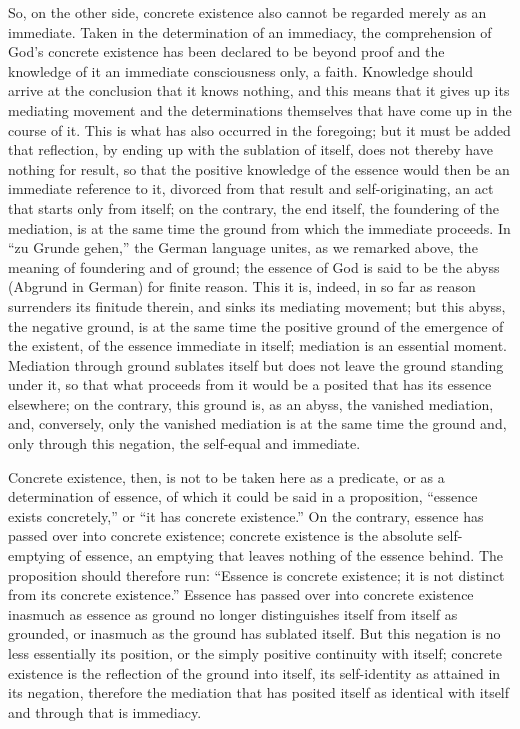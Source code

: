 So, on the other side, concrete existence also
cannot be regarded merely as an immediate.
Taken in the determination of an immediacy,
the comprehension of God's concrete existence
has been declared to be beyond proof
and the knowledge of it
an immediate consciousness only, a faith.
Knowledge should arrive at
the conclusion that it knows nothing,
and this means that it gives up its mediating movement
and the determinations themselves
that have come up in the course of it.
This is what has also occurred in the foregoing;
but it must be added that reflection,
by ending up with the sublation of itself,
does not thereby have nothing for result,
so that the positive knowledge of the essence
would then be an immediate reference to it,
divorced from that result and self-originating,
an act that starts only from itself;
on the contrary, the end itself,
the foundering of the mediation,
is at the same time the ground
from which the immediate proceeds.
In “zu Grunde gehen,” the German language unites,
as we remarked above,
the meaning of foundering and of ground;
the essence of God is said to be the
abyss (Abgrund in German) for finite reason.
This it is, indeed, in so far as
reason surrenders its finitude therein,
and sinks its mediating movement;
but this abyss, the negative ground,
is at the same time the positive ground
of the emergence of the existent,
of the essence immediate in itself;
mediation is an essential moment.
Mediation through ground sublates itself
but does not leave the ground standing under it,
so that what proceeds from it would be a posited
that has its essence elsewhere;
on the contrary, this ground is,
as an abyss, the vanished mediation,
and, conversely,
only the vanished mediation is
at the same time the ground
and, only through this negation,
the self-equal and immediate.

Concrete existence, then, is not to be taken here
as a predicate, or as a determination of essence,
of which it could be said in a proposition,
“essence exists concretely,” or “it has concrete existence.”
On the contrary, essence has passed over into concrete existence;
concrete existence is the absolute self-emptying of essence,
an emptying that leaves nothing of the essence behind.
The proposition should therefore run:
“Essence is concrete existence;
it is not distinct from its concrete existence.”
Essence has passed over into concrete existence
inasmuch as essence as ground
no longer distinguishes itself from itself as grounded,
or inasmuch as the ground has sublated itself.
But this negation is no less essentially its position,
or the simply positive continuity with itself;
concrete existence is
the reflection of the ground into itself,
its self-identity as attained in its negation,
therefore the mediation that has posited itself
as identical with itself and through that is immediacy.

